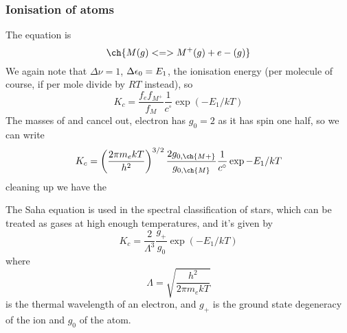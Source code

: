 \subsubsection{Ionisation of atoms}
The equation is 
\begin{equation*}
  \ch{M(g) <=> M^+(g) + e- (g)}
\end{equation*}
We again note that $\Delta\nu=1$, $\Delta\epsilon_0=E_1$, the ionisation energy (per molecule of course, if per mole divide by $RT$ instead), so
\begin{equation}
  K_c=\frac{f_ef_{M^+}}{f_M}\frac{1}{c^{\circ}}\exp(-E_1/kT)
\end{equation}
The masses of  and  cancel out, electron has $g_0=2$ as it has spin one half, so we can write
\begin{equation}
  K_c=\lf(\frac{2\pi m_ekT}{h^2} \rt)^{3/2}\frac{2g_{0,\ch{M+}}}{g_{0,\ch{M}}}\frac{1}{c^{\circ}}\exp{-E_1/kT}
\end{equation}
cleaning up we have the 
\begin{thrm}
The Saha equation is used in the spectral classification of stars, which can be treated as gases at high enough temperatures, and it's given by
\begin{equation}
  K_c=\frac{2}{\Lambda^3}\frac{g_+}{g_0}\exp(-E_1/kT)
\end{equation}
where 
\begin{equation}
  \Lambda=\sqrt{\frac{h^2}{2\pi m_ekT}}
\end{equation}
is the thermal wavelength of an electron, and $g_+$ is the ground state degeneracy of the ion and $g_0$ of the atom.
\end{thrm}

